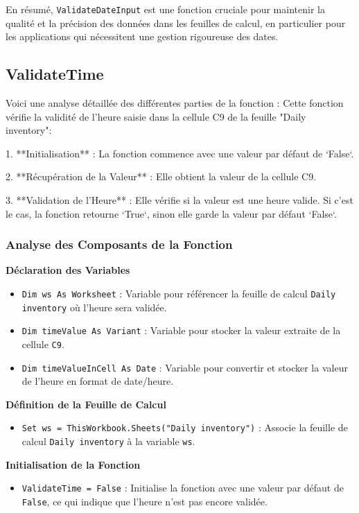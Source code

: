\documentclass[a4paper, oneside, 12pt, final]{extreport}
\begin{document}
En résumé, \texttt{ValidateDateInput} est une fonction cruciale pour maintenir la qualité et la précision des données dans les feuilles de calcul, en particulier pour les applications qui nécessitent une gestion rigoureuse des dates.
\subsection{ValidateTime}

Voici une analyse détaillée des différentes parties de la fonction :
Cette fonction vérifie la validité de l'heure saisie dans la cellule C9 de la feuille "Daily inventory":

1. **Initialisation** : La fonction commence avec une valeur par défaut de `False`.

2. **Récupération de la Valeur** : Elle obtient la valeur de la cellule C9.

3. **Validation de l’Heure** : Elle vérifie si la valeur est une heure valide. Si c'est le cas, la fonction retourne `True`, sinon elle garde la valeur par défaut `False`.
\subsubsection{Analyse des Composants de la Fonction}

\textbf{Déclaration des Variables}

\begin{itemize}
    \item \texttt{Dim ws As Worksheet} : Variable pour référencer la feuille de calcul \texttt{Daily inventory} où l'heure sera validée.
    \item \texttt{Dim timeValue As Variant} : Variable pour stocker la valeur extraite de la cellule \texttt{C9}.
    \item \texttt{Dim timeValueInCell As Date} : Variable pour convertir et stocker la valeur de l'heure en format de date/heure.
\end{itemize}

\textbf{Définition de la Feuille de Calcul}

\begin{itemize}
    \item \texttt{Set ws = ThisWorkbook.Sheets("Daily inventory")} : Associe la feuille de calcul \texttt{Daily inventory} à la variable \texttt{ws}.
\end{itemize}

\textbf{Initialisation de la Fonction}

\begin{itemize}
    \item \texttt{ValidateTime = False} : Initialise la fonction avec une valeur par défaut de \texttt{False}, ce qui indique que l'heure n'est pas encore validée.
\end{itemize}
\end{document}
